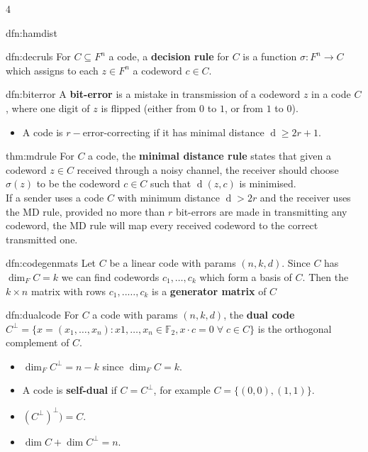 \documentclass[landscape, 8pt]{extarticle}
\DeclareMathOperator{\dd}{d}
\begin{document}
\begin{multicols*}{4}
\begin{dfn}{dfn:hamdist}{ }
		\end{dfn}
		
		
		\begin{dfn}{dfn:decruls}{ }
		For $C \subseteq F^n$ a code, a \textbf{decision rule} for $C$ is a function $\sigma: F^n \to C$ which assigns to each $z\in F^n$ a codeword $c\in C$.
		
		\end{dfn}
		
		
		\begin{dfn}{dfn:biterror}{ }
		A \textbf{bit-error} is a mistake in transmission of a codeword $z$ in a code $C$, where one digit of $z$ is flipped (either from $0$ to $1$, or from $1$ to $0$).
		\begin{itemize}
			\item A code is $r-$error-correcting if it has minimal distance $\dd \ge 2r+1$.
		\end{itemize}
		
		\end{dfn}
		
		
		\begin{thm}{thm:mdrule}{ }
		For $C$ a code, the \textbf{minimal distance rule} states that given a codeword $z\in C$ received through a noisy channel, the receiver should choose $\sigma(z)$ to be the codeword $c\in C$ such that $\dd(z, c)$ is minimised.\\
		If a sender uses a code $C$ with minimum distance $\dd > 2r$ and the receiver uses the MD rule, provided no more than $r$ bit-errors are made in transmitting any codeword, the MD rule will map every received codeword to the correct transmitted one.
		
		\end{thm}
		
		
		\begin{dfn}{dfn:codegenmats}{ }
		Let $C$ be a linear code with params $(n, k, d)$. Since $C$ has $\dim _F C = k$ we can find codewords $c_1, \dots, c_k$ which form a basis of $C$. Then the $k \times n$ matrix with rows $c_1, ..\dots, c_k$ is a \textbf{generator matrix} of $C$
		
		\end{dfn}
		
		
		\begin{dfn}{dfn:dualcode}{ }
		For $C$ a code with params $(n, k, d)$, the \textbf{dual code} $C^\perp = \{x = (x_1, \dots, x_n): x1, \dots, x_n\in \mathbb{F}_2, x\cdot c = 0 \; \forall \; c\in C\}$ is the orthogonal complement of $C$.
		\begin{itemize}
			\item $\dim_F C^\perp = n-k$ since $\dim_F C = k$.
			\item A code is \textbf{self-dual} if $C = C^\perp$, for example $C = \{(0, 0), (1, 1)\}$.
			\item $(C^\perp)^\perp) = C$.
			\item $\dim  C + \dim C^\perp = n$.
		\end{itemize}
		

\end{dfn}
\end{multicols*}
\end{document}
